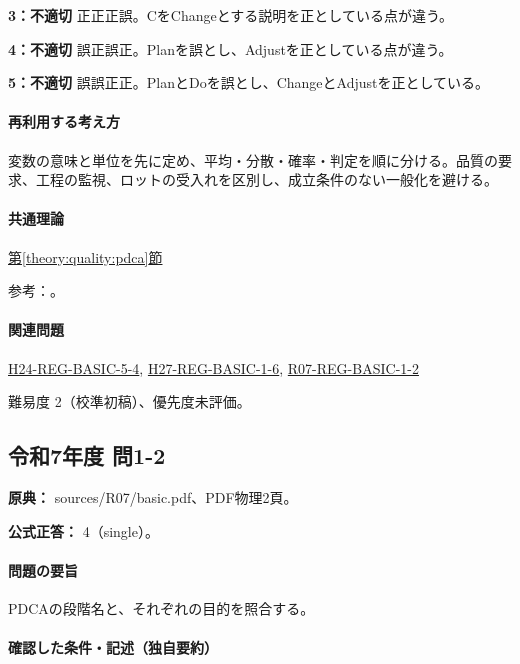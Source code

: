 \noindent\textbf{3：不適切} 正正正誤。CをChangeとする説明を正としている点が違う。\par

\noindent\textbf{4：不適切} 誤正誤正。Planを誤とし、Adjustを正としている点が違う。\par

\noindent\textbf{5：不適切} 誤誤正正。PlanとDoを誤とし、ChangeとAdjustを正としている。\par

\paragraph{再利用する考え方} 変数の意味と単位を先に定め、平均・分散・確率・判定を順に分ける。品質の要求、工程の監視、ロットの受入れを区別し、成立条件のない一般化を避ける。

\paragraph{共通理論} \hyperref[theory:quality:pdca]{第\ref*{theory:quality:pdca}節}

\par 参考：\cite{quality_iso_process}。

\paragraph{関連問題} \hyperref[q:h24-reg-basic-5-4]{H24-REG-BASIC-5-4}, \hyperref[q:h27-reg-basic-1-6]{H27-REG-BASIC-1-6}, \hyperref[q:r07-reg-basic-1-2]{R07-REG-BASIC-1-2}

\par 難易度 2（校準初稿）、優先度未評価。

\subsection{令和7年度 問1-2}
\label{q:r07-reg-basic-1-2}

\noindent\textbf{原典：} sources/R07/basic.pdf、PDF物理2頁。

\textbf{公式正答：} 4（single）。

\paragraph{問題の要旨} PDCAの段階名と、それぞれの目的を照合する。

\paragraph{確認した条件・記述（独自要約）}\mbox{}\par

